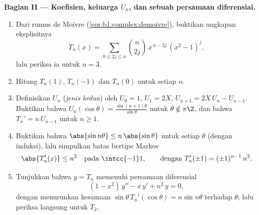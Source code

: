 \begin{problem}
\medskip
\noindent\textbf{Bagian II --- Koefisien, keluarga $U_n$, dan sebuah
persamaan diferensial.}
\begin{enumerate}[resume]
  \item Dari rumus de Moivre
        (\cref{cor:b1:complex:demoivre}), buktikan ungkapan
        eksplisitnya
        \[
        T_n(x) = \sum_{0 \leq 2j \leq n} \binom{n}{2j}\,
        x^{\,n-2j}\,(x^2 - 1)^j ,
        \]
        lalu periksa ia untuk $n = 3$.
  \item Hitung $T_n(1)$, $T_n(-1)$ dan $T_n(0)$ untuk setiap $n$.
  \item Definisikan $U_n$ (\emph{jenis kedua}) oleh $U_0 = 1$, $U_1 =
        2X$, $U_{n+1} = 2X\,U_n - U_{n-1}$. Buktikan bahwa
        $U_n(\cos\theta) = \frac{\sin(n+1)\theta}{\sin\theta}$
        untuk $\theta \notin \pi\Z$, dan bahwa $T_n' = n\,U_{n-1}$
        untuk $n \geq 1$.
  \item Buktikan bahwa $\abs{\sin n\theta} \leq n\,\abs{\sin\theta}$
        untuk setiap $\theta$ (dengan induksi), lalu simpulkan batas
        bertipe Markov
        \[
        \abs{T_n'(x)} \leq n^2
        \quad\text{pada } \intcc{-1}1,
        \qquad\text{dengan } T_n'(\pm1) = (\pm1)^{n-1}\,n^2 .
        \]
  \item Tunjukkan bahwa $y = T_n$ memenuhi persamaan diferensial
        \[
        (1 - x^2)\,y'' - x\,y' + n^2\,y = 0 ,
        \]
        dengan menurunkan kesamaan $\sin\theta\,
        T_n'(\cos\theta) = n\sin n\theta$ terhadap
        $\theta$; lalu periksa langsung untuk $T_2$.
\end{enumerate}


\end{problem}
